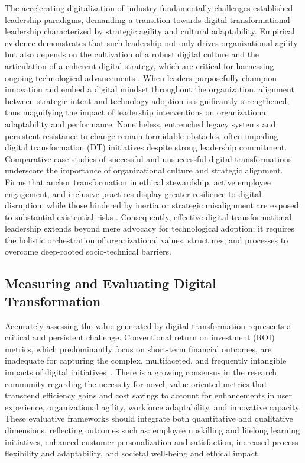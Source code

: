 \documentclass[sigconf]{acmart}
\begin{document}
The accelerating digitalization of industry fundamentally challenges established leadership paradigms, demanding a transition towards digital transformational leadership characterized by strategic agility and cultural adaptability. Empirical evidence demonstrates that such leadership not only drives organizational agility but also depends on the cultivation of a robust digital culture and the articulation of a coherent digital strategy, which are critical for harnessing ongoing technological advancements \cite{ref93}. When leaders purposefully champion innovation and embed a digital mindset throughout the organization, alignment between strategic intent and technology adoption is significantly strengthened, thus magnifying the impact of leadership interventions on organizational adaptability and performance. Nonetheless, entrenched legacy systems and persistent resistance to change remain formidable obstacles, often impeding digital transformation (DT) initiatives despite strong leadership commitment. Comparative case studies of successful and unsuccessful digital transformations underscore the importance of organizational culture and strategic alignment. Firms that anchor transformation in ethical stewardship, active employee engagement, and inclusive practices display greater resilience to digital disruption, while those hindered by inertia or strategic misalignment are exposed to substantial existential risks \cite{ref93}. Consequently, effective digital transformational leadership extends beyond mere advocacy for technological adoption; it requires the holistic orchestration of organizational values, structures, and processes to overcome deep-rooted socio-technical barriers.

\subsection{Measuring and Evaluating Digital Transformation}

Accurately assessing the value generated by digital transformation represents a critical and persistent challenge. Conventional return on investment (ROI) metrics, which predominantly focus on short-term financial outcomes, are inadequate for capturing the complex, multifaceted, and frequently intangible impacts of digital initiatives~\cite{ref94}. There is a growing consensus in the research community regarding the necessity for novel, value-oriented metrics that transcend efficiency gains and cost savings to account for enhancements in user experience, organizational agility, workforce adaptability, and innovative capacity. These evaluative frameworks should integrate both quantitative and qualitative dimensions, reflecting outcomes such as: employee upskilling and lifelong learning initiatives, enhanced customer personalization and satisfaction, increased process flexibility and adaptability, and societal well-being and ethical impact.
\end{document}
